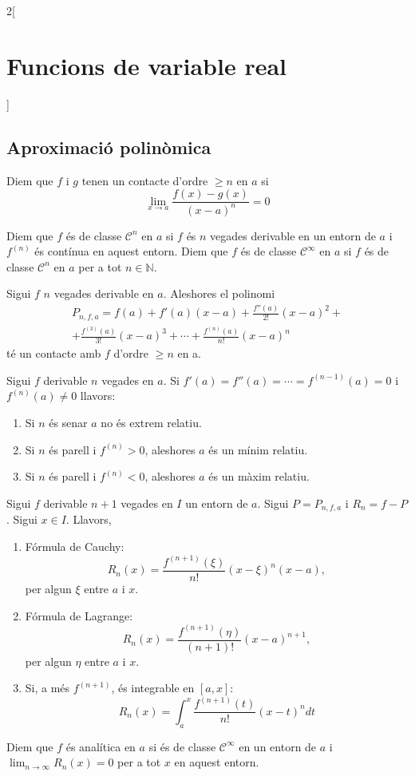 \documentclass[../../../main.tex]{subfiles}
\begin{document}
\begin{multicols}{2}[\section{Funcions de variable real}]
\subsection{Aproximació polinòmica}
\begin{definition}
Diem que $f$ i $g$ tenen un contacte d'ordre $\geq n$ en $a$ si $$\lim_{x\to a}\frac{f(x)-g(x)}{(x-a)^n}=0$$
\end{definition}
\begin{definition}
Diem que $f$ és de classe $\mathcal{C}^n$ en $a$ si $f$ és $n$ vegades derivable en un entorn de $a$ i $f^{(n)}$ és contínua en aquest entorn. Diem que $f$ és de classe $\mathcal{C}^\infty$ en $a$ si $f$ és de classe $\mathcal{C}^n$ en $a$ per a tot $n\in\mathbb{N}$.
\end{definition}
\begin{theorem}
Sigui $f$ $n$ vegades derivable en $a$. Aleshores el polinomi
\begin{multline*}
    P_{n,f,a}=f(a)+f'(a)(x-a)+\frac{f''(a)}{2!}(x-a)^2+\\+\frac{f^{(3)}(a)}{3!}(x-a)^3+\cdots+\frac{f^{(n)}(a)}{n!}(x-a)^n
\end{multline*} té un contacte amb $f$ d'ordre $\geq n$ en a.
\end{theorem}
\begin{theorem}
Sigui $f$ derivable $n$ vegades en $a$. Si $f'(a)=f''(a)=\cdots=f^{(n-1)}(a)=0$ i $f^{(n)}(a)\ne 0$ llavors:
\begin{enumerate}
    \item Si $n$ és senar $a$ no és extrem relatiu.
    \item Si $n$ és parell i $f^{(n)}>0$, aleshores $a$ és un mínim relatiu.
    \item Si $n$ és parell i $f^{(n)}<0$, aleshores $a$ és un màxim relatiu.
\end{enumerate}
\end{theorem}
\begin{theorem}
Sigui $f$ derivable $n+1$ vegades en $I$ un entorn de $a$. Sigui $P=P_{n,f,a}$ i $R_n=f-P$. Sigui $x\in I$. Llavors,
\begin{enumerate}
    \item Fórmula de Cauchy: $$R_n(x)=\frac{f^{(n+1)}(\xi)}{n!}(x-\xi)^n(x-a),$$ per algun $\xi$ entre $a$ i $x$.
    \item Fórmula de Lagrange: $$R_n(x)=\frac{f^{(n+1)}(\eta)}{(n+1)!}(x-a)^{n+1},$$ per algun $\eta$ entre $a$ i $x$.
    \item Si, a més $f^{(n+1)}$, és integrable en $[a,x]$: $$R_n(x)=\int_a^x\frac{f^{(n+1)}(t)}{n!}(x-t)^ndt$$
\end{enumerate}
\end{theorem}
\begin{definition}
Diem que $f$ és analítica en $a$ si és de classe $\mathcal{C}^\infty$ en un entorn de $a$ i $\lim_{n\to\infty}R_n(x)=0$ per a tot $x$ en aquest entorn.
\end{definition}

\end{multicols}
\end{document}
